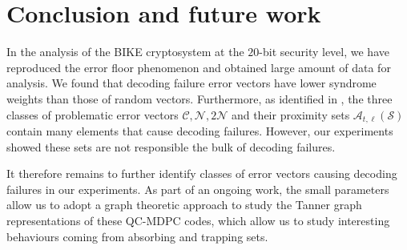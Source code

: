 \section{Conclusion and future work}

In the analysis of the BIKE cryptosystem at the $20$-bit security level, we have reproduced the error floor phenomenon and obtained large amount of data for analysis. We found that decoding failure error vectors have lower syndrome weights than those of random vectors. Furthermore, as identified in \cite{Vasseur-thesis,Vasseur:2021:eprint}, the three classes of problematic error vectors $\mathcal{C}, \mathcal{N}, 2\mathcal{N}$ and their proximity sets $\mathcal{A}_{t,\ell}(\mathcal{S})$ contain many elements that cause decoding failures. However, our experiments showed these sets are not responsible the bulk of decoding failures.

It therefore remains to further identify classes of error vectors causing decoding failures in our experiments. As part of an ongoing work, the small parameters allow us to adopt a graph theoretic approach to study the Tanner graph representations of these QC-MDPC codes, which allow us to study interesting behaviours coming from absorbing and trapping sets.